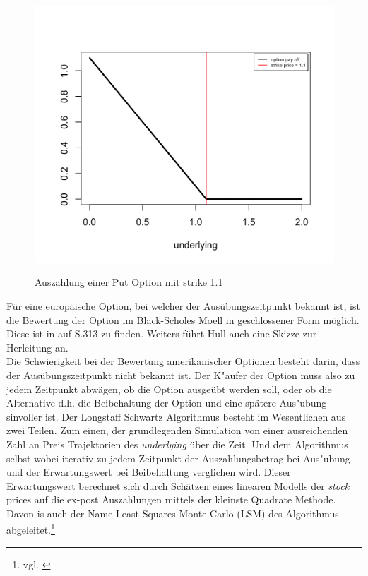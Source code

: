 \documentclass[10pt,a4paper]{article}\usepackage[]{graphicx}\usepackage[]{color}
\begin{document}
\begin{figure}[H]
  \centering
  \includegraphics[scale=0.5]{PlotOption.png}
  \label{fig:PlotOption}
  \caption{Auszahlung einer Put Option mit strike 1.1}
\end{figure}

Für eine europäische Option, bei welcher der Ausübungszeitpunkt bekannt ist, ist die Bewertung der Option im Black-Scholes Moell in geschlossener Form möglich. Diese ist in \cite{Hull} auf S.313 zu finden. Weiters führt Hull auch eine Skizze zur Herleitung an.\\
Die Schwierigkeit bei der Bewertung amerikanischer Optionen besteht darin, dass der Ausübungszeitpunkt nicht bekannt ist. Der K"aufer der Option muss also zu jedem Zeitpunkt abwägen, ob die Option ausgeübt werden soll, oder ob die Alternative d.h. die Beibehaltung der Option und eine spätere Aus"ubung sinvoller ist. 
Der Longstaff Schwartz Algorithmus besteht im Wesentlichen aus zwei Teilen. Zum einen, der grundlegenden Simulation von einer ausreichenden Zahl an Preis Trajektorien des \textit{underlying} über die Zeit. Und dem Algorithmus selbst wobei iterativ zu jedem Zeitpunkt der Auszahlungsbetrag bei Aus"ubung und der Erwartungswert bei Beibehaltung verglichen wird. Dieser Erwartungswert berechnet sich durch Schätzen eines linearen Modells der \textit{stock} prices auf die ex-post Auszahlungen mittels der kleinste Quadrate Methode. Davon is auch der Name  Least Squares Monte Carlo (LSM) des Algorithmus abgeleitet.\footnote{vgl. \cite[S.114]{schwartz2001}} 
\end{document}
